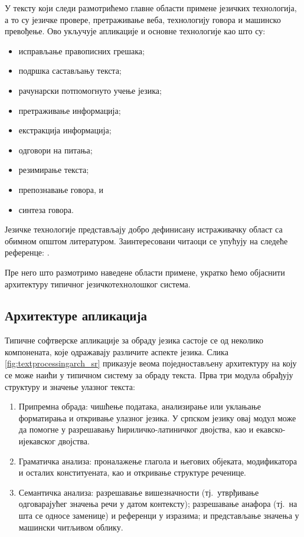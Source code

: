 \begin{multicols}{2}
У тексту који следи размотрићемо главне области примене језичких технологија, а то су  језичке провере, претраживање веба, технологију говора и машинско превођење. Ово укључује апликације и основне технологије као што су:
\begin{itemize}
 \item исправљање правописних грешака;
 \item подршка састављању текста;
 \item рачунарски потпомогнуто учење језика;
 \item претраживање информација;
\item  екстракција информација;
 \item одговори на питања;
\item резимирање текста;
\item препознавање говора, и
\item  синтеза говора.
\end{itemize}
Језичке технологије представљају добро дефинисану истраживачку област са обимном општом литературом. Заинтересовани читаоци се упућују на следеће референце: \cite{jurafsky-martin01,manning-schuetze1,lt-survey1}.

Пре него што размотримо наведене  области примене,  укратко ћемо објаснити архитектуру типичног језичкотехнолошког система.

 \subsection {Архитектуре апликација}
   
Типичне софтверске апликације за обраду језика састоје се од неколико компонената, које одражавају различите аспекте језика. Слика \ref{fig:textprocessingarch_sr} приказује веома поједностављену архитектуру на коју се може наићи у типичном систему за обраду текста. Прва три модула обрађују структуру и значење улазног текста:

\begin{enumerate}
\item Припремна обрада: чишћење података, анализирање или уклањање форматирања и откривање улазног језика. У српском језику овај модул може да помогне у разрешавању ћириличко-латиничког двојства, као и екавско-ијекавског двојства. 
\item Граматичка анализа: проналажење глагола и његових објеката, модификатора и осталих конституената, као и откривање структуре реченице. 
\item Семантичка анализа: разрешавање вишезначности (тј.~утврђивање одговарајућег значења речи у датом контексту); разрешавање анафора (тј.~на шта се односе заменице) и референци у изразима; и представљање значења у машински читљивом облику.
\end{enumerate}


\end{multicols}
